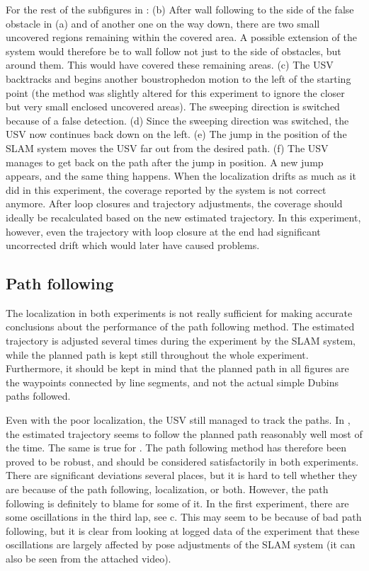 For the rest of the subfigures in : (b) After wall following to the side of the false obstacle in (a) and of another one on the way down, there are two small uncovered regions remaining within the covered area. A possible extension of the system would therefore be to wall follow not just to the side of obstacles, but around them. This would have covered these remaining areas. (c) The USV backtracks and begins another boustrophedon motion to the left of the starting point (the method was slightly altered for this experiment to ignore the closer but very small enclosed uncovered areas). The sweeping direction is switched because of a false detection. (d) Since the sweeping direction was switched, the USV now continues back down on the left. (e) The jump in the position of the SLAM system moves the USV far out from the desired path. (f) The USV manages to get back on the path after the jump in position. A new jump appears, and the same thing happens. When the localization drifts as much as it did in this experiment, the coverage reported by the system is not correct anymore. After loop closures and trajectory adjustments, the coverage should ideally be recalculated based on the new estimated trajectory. In this experiment, however, even the trajectory with loop closure at the end had significant uncorrected drift which would later have caused problems.

\subsection{Path following}

The localization in both experiments is not really sufficient for making accurate conclusions about the performance of the path following method. The estimated trajectory is adjusted several times during the experiment by the SLAM system, while the planned path is kept still throughout the whole experiment. Furthermore, it should be kept in mind that the planned path in all figures are the waypoints connected by line segments, and not the actual simple Dubins paths followed.

Even with the poor localization, the USV still managed to track the paths. In , the estimated trajectory seems to follow the planned path reasonably well most of the time. The same is true for . The path following method has therefore been proved to be robust, and should be considered satisfactorily in both experiments. There are significant deviations several places, but it is hard to tell whether they are because of the path following, localization, or both. However, the path following is definitely to blame for some of it. In the first experiment, there are some oscillations in the third lap, see c. This may seem to be because of bad path following, but it is clear from looking at logged data of the experiment that these oscillations are largely affected by pose adjustments of the SLAM system (it can also be seen from the attached video).

